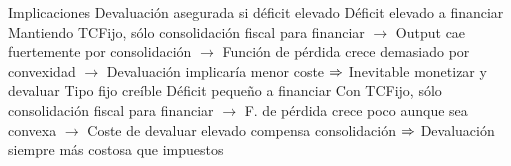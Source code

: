 \documentclass{nuevotema}
\begin{document}
\begin{esquemal}
		\2 Implicaciones
			\3 Devaluación asegurada si déficit elevado
				\4 Déficit elevado a financiar
				\4[] Mantiendo TCFijo, sólo consolidación fiscal para financiar
				\4[] $\to$ Output cae fuertemente por consolidación
				\4[] $\to$ Función de pérdida crece demasiado por convexidad
				\4[] $\to$ Devaluación implicaría menor coste
				\4[] $\Rightarrow$ Inevitable monetizar y devaluar
			\3 Tipo fijo creíble
				\4 Déficit pequeño a financiar
				\4[] Con TCFijo, sólo consolidación fiscal para financiar
				\4[] $\to$ F. de pérdida crece poco aunque sea convexa
				\4[] $\to$ Coste de devaluar elevado compensa consolidación
				\4[] $\Rightarrow$ Devaluación siempre más costosa que impuestos

\end{esquemal}
\end{document}
